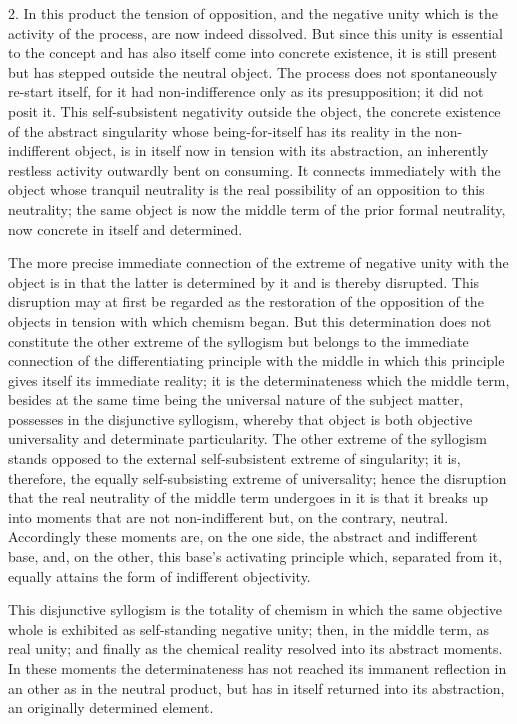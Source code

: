 2. In this product the tension of opposition,
and the negative unity which is the activity of the process,
are now indeed dissolved.
But since this unity is essential to the concept
and has also itself come into concrete existence,
it is still present but has stepped outside the neutral object.
The process does not spontaneously re-start itself,
for it had non-indifference only as its presupposition;
it did not posit it.
This self-subsistent negativity outside the object,
the concrete existence of the abstract singularity
whose being-for-itself has its reality in
the non-indifferent object,
is in itself now in tension with its abstraction,
an inherently restless activity outwardly bent on consuming.
It connects immediately with the object
whose tranquil neutrality is the real possibility
of an opposition to this neutrality;
the same object is now the middle term
of the prior formal neutrality,
now concrete in itself and determined.

The more precise immediate connection
of the extreme of negative unity with the object is
in that the latter is determined by it
and is thereby disrupted.
This disruption may at first be regarded
as the restoration of the opposition of the objects
in tension with which chemism began.
But this determination does not constitute
the other extreme of the syllogism
but belongs to the immediate connection
of the differentiating principle
with the middle in which this principle
gives itself its immediate reality;
it is the determinateness which the middle term,
besides at the same time being
the universal nature of the subject matter,
possesses in the disjunctive syllogism,
whereby that object is both
objective universality and determinate particularity.
The other extreme of the syllogism stands opposed to the
external self-subsistent extreme of singularity;
it is, therefore, the equally
self-subsisting extreme of universality;
hence the disruption that the real neutrality
of the middle term undergoes in it is
that it breaks up into moments
that are not non-indifferent
but, on the contrary, neutral.
Accordingly these moments are, on the one side,
the abstract and indifferent base,
and, on the other, this base's activating principle
which, separated from it, equally attains
the form of indifferent objectivity.

This disjunctive syllogism is the totality of chemism
in which the same objective whole is
exhibited as self-standing negative unity;
then, in the middle term, as real unity;
and finally as the chemical reality
resolved into its abstract moments.
In these moments the determinateness has
not reached its immanent reflection in an other
as in the neutral product,
but has in itself returned into its abstraction,
an originally determined element.

